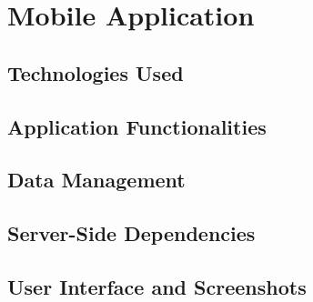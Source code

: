 \section{Mobile Application}
\label{sec:mobile_application}



\subsection{Technologies Used}

\subsection{Application Functionalities}

\subsection{Data Management}

\subsection{Server-Side Dependencies}

\subsection{User Interface and Screenshots}

